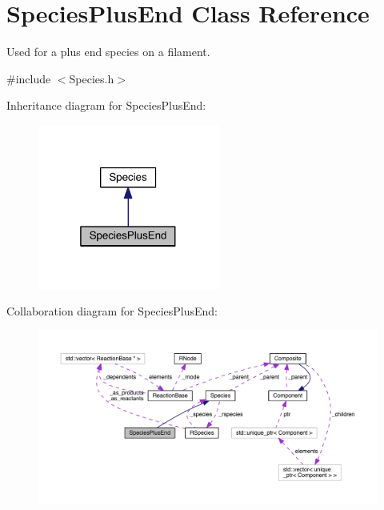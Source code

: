 \hypertarget{classSpeciesPlusEnd}{\section{Species\+Plus\+End Class Reference}
\label{classSpeciesPlusEnd}
}


Used for a plus end species on a filament.  




{\ttfamily \#include $<$Species.\+h$>$}



Inheritance diagram for Species\+Plus\+End\+:\nopagebreak
\begin{figure}[H]
\begin{center}
\leavevmode
\includegraphics[width=169pt]{classSpeciesPlusEnd__inherit__graph}
\end{center}
\end{figure}


Collaboration diagram for Species\+Plus\+End\+:\nopagebreak
\begin{figure}[H]
\begin{center}
\leavevmode
\includegraphics[width=350pt]{classSpeciesPlusEnd__coll__graph}
\end{center}
\end{figure}

